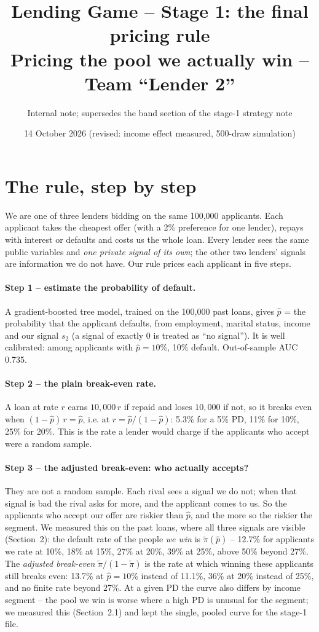 \documentclass[11pt,a4paper]{article}
\title{Lending Game -- Stage 1: the final pricing rule\\[2pt]
\large Pricing the pool we actually win -- Team ``Lender 2''}
\author{Internal note; supersedes the band section of the stage-1 strategy note}
\date{14 October 2026 (revised: income effect measured, 500-draw simulation)}
\begin{document}
\maketitle

\section{The rule, step by step}
We are one of three lenders bidding on the same 100,000 applicants. Each applicant takes the cheapest offer (with a
2\% preference for one lender), repays with interest or defaults and costs us the whole loan. Every lender sees the same
public variables and \emph{one private signal of its own}; the other two lenders' signals are information we do not have.
Our rule prices each applicant in five steps.

\paragraph{Step 1 -- estimate the probability of default.} A gradient-boosted tree model, trained on the 100,000 past
loans, gives $\hat p$ = the probability that the applicant defaults, from employment, marital status, income and our
signal $s_2$ (a signal of exactly 0 is treated as ``no signal''). It is well calibrated: among applicants with
$\hat p = 10\%$, 10\% default. Out-of-sample AUC 0.735.

\paragraph{Step 2 -- the plain break-even rate.} A loan at rate $r$ earns $10{,}000\,r$ if repaid and loses $10{,}000$ if
not, so it breaks even when $(1-\hat p)\,r = \hat p$, i.e. at $r = \hat p/(1-\hat p)$: 5.3\% for a 5\% PD, 11\% for 10\%,
25\% for 20\%. This is the rate a lender would charge if the applicants who accept were a random sample.

\paragraph{Step 3 -- the adjusted break-even: who actually accepts?} They are not a random sample. Each rival sees a
signal we do not; when that signal is bad the rival asks for more, and the applicant comes to us. So the applicants who
accept our offer are riskier than $\hat p$, and the more so the riskier the segment. We measured this on the past loans,
where all three signals are visible (Section~2): the default rate of the people \emph{we win} is $\tilde\pi(\hat p)$ --
12.7\% for applicants we rate at 10\%, 18\% at 15\%, 27\% at 20\%, 39\% at 25\%, above 50\% beyond 27\%. The
\emph{adjusted break-even} $\tilde\pi/(1-\tilde\pi)$ is the rate at which winning these applicants still breaks even:
13.7\% at $\hat p = 10\%$ instead of 11.1\%, 36\% at 20\% instead of 25\%, and no finite rate beyond 27\%. At a given PD
the curve also differs by income segment -- the pool we win is worse where a high PD is unusual for the segment; we
measured this (Section~2.1) and kept the single, pooled curve for the stage-1 file.
\end{document}
